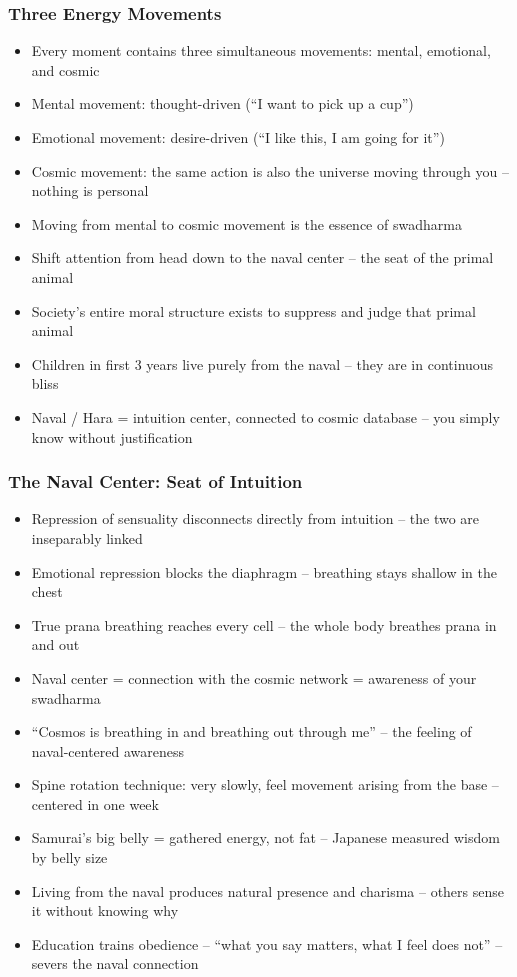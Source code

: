 \begin{frame}[fragile]\frametitle{Three Energy Movements}
  \begin{itemize}
    \item Every moment contains three simultaneous movements: mental, emotional, and cosmic
    \item Mental movement: thought-driven (``I want to pick up a cup'')
    \item Emotional movement: desire-driven (``I like this, I am going for it'')
    \item Cosmic movement: the same action is also the universe moving through you -- nothing is personal
    \item Moving from mental to cosmic movement is the essence of swadharma
    \item Shift attention from head down to the naval center -- the seat of the primal animal
    \item Society's entire moral structure exists to suppress and judge that primal animal
    \item Children in first 3 years live purely from the naval -- they are in continuous bliss
    \item Naval / Hara = intuition center, connected to cosmic database -- you simply know without justification
  \end{itemize}
\end{frame}

\begin{frame}[fragile]\frametitle{The Naval Center: Seat of Intuition}
  \begin{itemize}
    \item Repression of sensuality disconnects directly from intuition -- the two are inseparably linked
    \item Emotional repression blocks the diaphragm -- breathing stays shallow in the chest
    \item True prana breathing reaches every cell -- the whole body breathes prana in and out
    \item Naval center = connection with the cosmic network = awareness of your swadharma
    \item ``Cosmos is breathing in and breathing out through me'' -- the feeling of naval-centered awareness
    \item Spine rotation technique: very slowly, feel movement arising from the base -- centered in one week
    \item Samurai's big belly = gathered energy, not fat -- Japanese measured wisdom by belly size
    \item Living from the naval produces natural presence and charisma -- others sense it without knowing why
    \item Education trains obedience -- ``what you say matters, what I feel does not'' -- severs the naval connection
  \end{itemize}
\end{frame}

